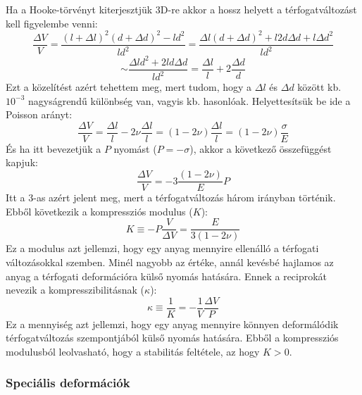 \documentclass[a4paper,12pt]{article}
\begin{document}
Ha a Hooke-törvényt kiterjesztjük 3D-re akkor a hossz helyett a térfogatváltozást kell figyelembe venni:
\begin{equation}
    \frac{\Delta V}{V} = \frac{(l + \Delta l)^2 (d + \Delta d)^2 - ld^2}{ld^2} = \frac{\Delta l (d + \Delta d)^2 + l 2d \Delta d + l \Delta d^2}{ld^2}
\end{equation}
\begin{equation}
    \sim \frac{\Delta l d^2 + 2 l d \Delta d}{ld^2} = \frac{\Delta l}{l} + 2 \frac{\Delta d}{d}
\end{equation}
Ezt a közelítést azért tehettem meg, mert tudom, hogy a $\Delta l$ és $\Delta d$ között kb. $10^{-3}$ nagyságrendű különbség van, vagyis kb. hasonlóak.
Helyettesítsük be ide a Poisson arányt:
\begin{equation}
    \frac{\Delta V}{V} = \frac{\Delta l}{l} - 2 \nu \frac{\Delta l}{l} = (1 - 2 \nu) \frac{\Delta l}{l} = (1 - 2 \nu) \frac{\sigma}{E}
\end{equation}
És ha itt bevezetjük a $P$ nyomást ($P = - \sigma$), akkor a következő összefüggést kapjuk:
\begin{equation}
    \frac{\Delta V}{V} = - 3 \frac{(1 - 2 \nu)}{E} P
\end{equation}
Itt a 3-as azért jelent meg, mert a térfogatváltozás három irányban történik. Ebből következik a kompressziós modulus ($K$):
\begin{equation}
    K \equiv - P \frac{V}{\Delta V} = \frac{E}{3(1 - 2 \nu)}
\end{equation}
Ez a modulus azt jellemzi, hogy egy anyag mennyire ellenálló a térfogati változásokkal szemben. Minél nagyobb az értéke, annál kevésbé hajlamos az anyag a térfogati deformációra külső nyomás hatására.
Ennek a reciprokát nevezik a kompresszibilitásnak ($\kappa$):
\begin{equation}
    \kappa \equiv \frac{1}{K} = - \frac{1}{V} \frac{\Delta V}{P}
\end{equation}
Ez a mennyiség azt jellemzi, hogy egy anyag mennyire könnyen deformálódik térfogatváltozás szempontjából külső nyomás hatására. Ebből a
kompressziós modulusból leolvasható, hogy a stabilitás feltétele, az hogy $K > 0$.

\subsubsection{Speciális deformációk}
\end{document}
